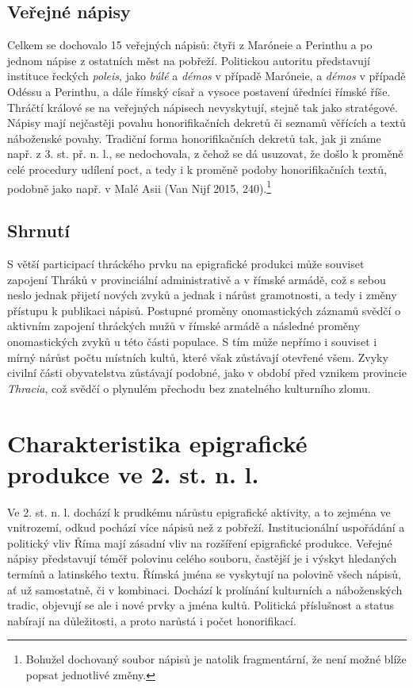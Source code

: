 \subsection[veřejné-nápisy-12]{Veřejné nápisy}

Celkem se dochovalo 15 veřejných nápisů: čtyři z Maróneie a Perinthu a po jednom nápise z ostatních měst na pobřeží. Politickou autoritu představují instituce řeckých {\em poleis}, jako {\em búlé} a {\em démos} v případě Maróneie, a {\em démos} v případě Odéssu a Perinthu, a dále římský císař a vysoce postavení úředníci římské říše. Thráčtí králové se na veřejných nápisech nevyskytují, stejně tak jako stratégové. Nápisy mají nejčastěji povahu honorifikačních dekretů či seznamů věřících a textů náboženské povahy. Tradiční forma honorifikačních dekretů tak, jak ji známe např. z 3. st. př. n. l., se nedochovala, z čehož se dá usuzovat, že došlo k proměně celé procedury udílení poct, a tedy i k proměně podoby honorifikačních textů, podobně jako např. v Malé Asii (Van Nijf 2015, 240).\footnote{Bohužel dochovaný soubor nápisů je natolik fragmentární, že není možné blíže popsat jednotlivé změny.}

\subsection[shrnutí-16]{Shrnutí}

S větší participací thráckého prvku na epigrafické produkci může souviset zapojení Thráků v provinciální administrativě a v římské armádě, což s sebou neslo jednak přijetí nových zvyků a jednak i nárůst gramotnosti, a tedy i změny přístupu k publikaci nápisů. Postupné proměny onomastických záznamů svědčí o aktivním zapojení thráckých mužů v římské armádě a následné proměny onomastických zvyků u této části populace. S tím může nepřímo i souviset i mírný nárůst počtu místních kultů, které však zůstávají otevřené všem. Zvyky civilní části obyvatelstva zůstávají podobné, jako v období před vznikem provincie {\em Thracia}, což svědčí o plynulém přechodu bez znatelného kulturního zlomu.

\section[charakteristika-epigrafické-produkce-ve-2.-st.-n.-l.]{Charakteristika epigrafické produkce ve 2. st. n. l.}

Ve 2. st. n. l. dochází k prudkému nárůstu epigrafické aktivity, a to zejména ve vnitrozemí, odkud pochází více nápisů než z pobřeží. Institucionální uspořádání a politický vliv Říma mají zásadní vliv na rozšíření epigrafické produkce. Veřejné nápisy představují téměř polovinu celého souboru, častější je i výskyt hledaných termínů a latinského textu. Římská jména se vyskytují na polovině všech nápisů, ať už samostatně, či v kombinaci. Dochází k prolínání kulturních a náboženských tradic, objevují se ale i nové prvky a jména kultů. Politická příslušnost a status nabírají na důležitosti, a proto narůstá i počet honorifikací.

